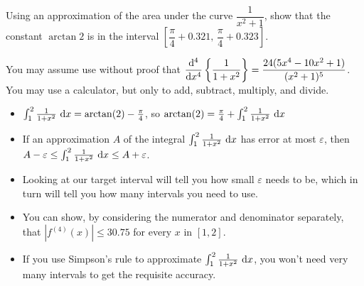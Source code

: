 \begin{question}
Using an approximation of the area under the curve $\dfrac{1}{x^2+1}$, show that the constant $\arctan2$ is in the interval $\left[\dfrac{\pi}{4}+0.321,\, \dfrac{\pi}{4}+0.323\right]$.

You may assume use without proof that $\displaystyle\frac{\mathrm{d}^4}{\mathrm{d}{x}^4}\left\{\frac{1}{1+x^2}\right\} = \dfrac{24(5x^4-10x^2+1)}{(x^2+1)^5}$. You may use a calculator, but only to add, subtract, multiply, and divide.
\end{question}
\begin{hint}
\begin{itemize}
\item $\int_1^2 \frac{1}{1+x^2}~\mathrm{d}x = \arctan(2) - \frac{\pi}{4}$, so
$\arctan(2) = \frac{\pi}{4}+\int_1^2 \frac{1}{1+x^2}~\mathrm{d}x$
\item If an approximation $A$ of the integral $ \int_1^2 \frac{1}{1+x^2}~\mathrm{d}x$ has error at most $\varepsilon$, then $A-\varepsilon \leq \int_1^2 \frac{1}{1+x^2}~\mathrm{d}x \leq A+\varepsilon$.
\item Looking at our target interval will tell you how small $\varepsilon$ needs to be, which in turn will tell you how many intervals you need to use.
\item You can show, by considering the numerator and denominator separately, that $|f^{(4)}(x)| \leq 30.75$ for every $x$ in $[1,2]$.
\item If you use Simpson's rule to approximate $\int_1^2 \frac{1}{1+x^2}~\mathrm{d}x$, you won't need very many intervals to get the requisite accuracy.
\end{itemize}
\end{hint}
